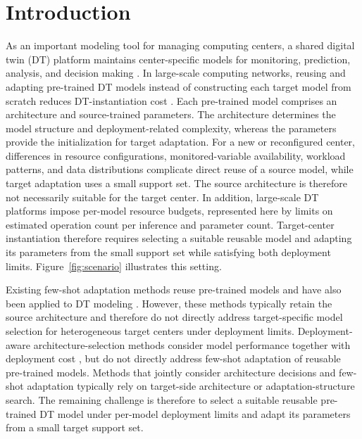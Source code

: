 \documentclass[a4paper,fleqn]{cas-sc}
\begin{document}
\maketitle


\section{Introduction}
\label{sec:introduction}

As an important modeling tool for managing computing centers, a shared digital
twin (DT) platform maintains center-specific models for monitoring, prediction,
analysis, and decision making \cite{ref1,ref2,ref3,ref4}. In large-scale computing
networks, reusing and adapting pre-trained DT models instead of constructing
each target model from scratch reduces DT-instantiation cost
\cite{ref8,ref11}. Each pre-trained model comprises an architecture and
source-trained parameters. The architecture determines the model structure and
deployment-related complexity, whereas the parameters provide the
initialization for target adaptation. For a new or reconfigured center, differences in resource configurations,
monitored-variable availability, workload patterns, and data distributions
complicate direct reuse of a source model, while target adaptation uses a small
support set. The source architecture is therefore not necessarily suitable for
the target center. In addition, large-scale DT platforms impose per-model
resource budgets, represented here by limits on estimated operation count per
inference and parameter count. Target-center instantiation therefore requires
selecting a suitable reusable model and adapting its parameters from the small
support set while satisfying both deployment limits. Figure~\ref{fig:scenario}
illustrates this setting.

Existing few-shot adaptation methods reuse pre-trained models
\cite{ref9,ref10} and have also been applied to DT modeling \cite{ref11}.
However, these methods typically retain the source architecture and therefore
do not directly address target-specific model selection for heterogeneous target
centers under deployment limits. Deployment-aware architecture-selection
methods consider model performance together with deployment cost
\cite{ref12,ref13,ref26}, but do not directly address few-shot adaptation of
reusable pre-trained models. Methods that jointly consider architecture
decisions and few-shot adaptation \cite{ref30,ref31,ref32} typically rely on
target-side architecture or adaptation-structure search. The remaining
challenge is therefore to select a suitable reusable pre-trained DT model under
per-model deployment limits and adapt its parameters from a small target
support set.
\end{document}
